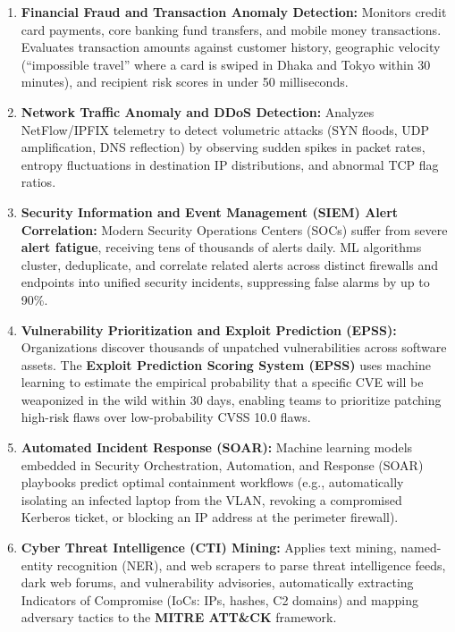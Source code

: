 \begin{enumerate}
\item \textbf{Financial Fraud and Transaction Anomaly Detection:}
Monitors credit card payments, core banking fund transfers, and mobile money transactions. Evaluates transaction amounts against customer history, geographic velocity (``impossible travel'' where a card is swiped in Dhaka and Tokyo within 30 minutes), and recipient risk scores in under 50 milliseconds.

\item \textbf{Network Traffic Anomaly and DDoS Detection:}
Analyzes NetFlow/IPFIX telemetry to detect volumetric attacks (SYN floods, UDP amplification, DNS reflection) by observing sudden spikes in packet rates, entropy fluctuations in destination IP distributions, and abnormal TCP flag ratios.

\item \textbf{Security Information and Event Management (SIEM) Alert Correlation:}
Modern Security Operations Centers (SOCs) suffer from severe \textbf{alert fatigue}, receiving tens of thousands of alerts daily. ML algorithms cluster, deduplicate, and correlate related alerts across distinct firewalls and endpoints into unified security incidents, suppressing false alarms by up to 90\%.

\item \textbf{Vulnerability Prioritization and Exploit Prediction (EPSS):}
Organizations discover thousands of unpatched vulnerabilities across software assets. The \textbf{Exploit Prediction Scoring System (EPSS)} uses machine learning to estimate the empirical probability that a specific CVE will be weaponized in the wild within 30 days, enabling teams to prioritize patching high-risk flaws over low-probability CVSS 10.0 flaws.

\item \textbf{Automated Incident Response (SOAR):}
Machine learning models embedded in Security Orchestration, Automation, and Response (SOAR) playbooks predict optimal containment workflows (e.g., automatically isolating an infected laptop from the VLAN, revoking a compromised Kerberos ticket, or blocking an IP address at the perimeter firewall).

\item \textbf{Cyber Threat Intelligence (CTI) Mining:}
Applies text mining, named-entity recognition (NER), and web scrapers to parse threat intelligence feeds, dark web forums, and vulnerability advisories, automatically extracting Indicators of Compromise (IoCs: IPs, hashes, C2 domains) and mapping adversary tactics to the \textbf{MITRE ATT\&CK} framework.


\end{enumerate}
